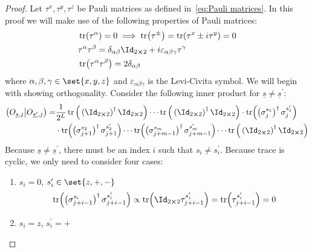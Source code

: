 \begin{proof}
    Let \(\tau^{x},\tau^{y},\tau^{z}\) be Pauli matrices as defined in~\eqref{eq:Pauli matrices}.
    In this proof we will make use of the following properties of Pauli matrices:
    \begin{align}
        &\tr(\tau^{\alpha}) = 0 \implies \tr(\tau^{\pm}) = \tr(\tau^x \pm i \tau^y) = 0\label{eq:traceless}\\
        &\tau^{\alpha}\tau^{\beta} = \delta_{\alpha \beta} \Id_{2\cross 2} + i \varepsilon_{\alpha\beta\gamma}
         \tau^{\gamma}\label{eq:product}\\
        &\tr(\tau^{\alpha} \tau^{\beta}) = 2\delta_{\alpha\beta}\label{eq:product trace}
    \end{align}
    where \(\alpha,\beta,\gamma \in \set{x,y,z}\) and \(\varepsilon_{\alpha\beta\gamma}\) is the Levi-Civita
    symbol.
    We will begin with showing orthogonality. Consider the following inner product for 
    \(\underline{s}\neq \underline{s}^{\prime}\):
    \begin{align}
    \hs{O_{\underline{s},j}}{O_{\underline{s^{\prime}},j}} =& \frac{1}{\dimension} 
    \tr\Big(\left(\Id_{2\cross 2}\right)^{\dagger}\Id_{2\cross 2}\Big) \cdots 
    \tr\Big(\left(\Id_{2\cross 2}\right)^{\dagger}\Id_{2\cross 2}\Big)
    \cdot \tr(\left(\sigma_j^{s_1}\right)^{\dagger} \sigma_j^{s_1^{\prime}})\nonumber\\ 
    &\cdot \tr(\left(\sigma_{j+1}^{s_2}\right)^{\dagger} \sigma_{j+1}^{s_2^{\prime}})
    \cdots \tr(\left(\sigma_{j+m-1}^{s_m}\right)^{\dagger} \sigma_{j+m-1}^{s_m^{\prime}}) \cdots 
    \tr\Big(\left(\Id_{2\cross 2}\right)^{\dagger}\Id_{2\cross 2}\Big)
    \label{eq:orthogonality proof fragment}
    \end{align}
    Because \(\underline{s}\neq \underline{s}^{\prime}\), there must be an index \(i\) such that
    \(s_i\neq s_i^{\prime}\). Because trace is cyclic, we only need to consider four cases:
    \begin{enumerate}
        \item {\(s_i = 0\), \(s_i^{\prime} \in \set{z,+,-}\)
        \begin{align*}
            \tr(\left(\sigma^{s_i}_{j+i-1}\right)^{\dagger} \sigma^{s_i^{\prime}}_{j+i-1}) \propto
            \tr(\Id_{2\cross 2 }\tau^{s_i^{\prime}}_{j+i-1}) =
            \tr(\tau^{s_i^{\prime}}_{j+i-1})  = 0
        \end{align*}
        }
        \item { \(s_i = z\), \(s_i^{\prime} = +\)
}
\end{enumerate}
\end{proof}
